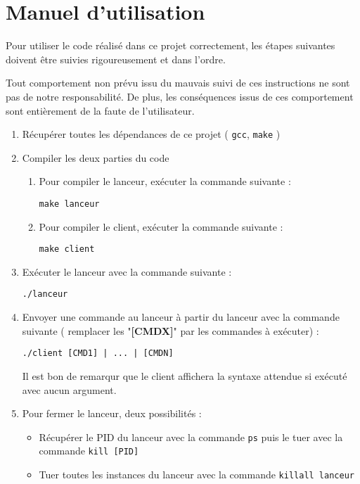 \documentclass[12pt]{article}
\begin{document}
    \section{Manuel d'utilisation}

    Pour utiliser le code réalisé dans ce projet correctement, les étapes suivantes doivent être suivies rigoureusement et dans l'ordre.

    Tout comportement non prévu issu du mauvais suivi de ces instructions ne sont pas de notre responsabilité. De plus, les conséquences issus de ces comportement sont entièrement de la faute de l'utilisateur.

    \begin{enumerate}
        \item Récupérer toutes les dépendances de ce projet ( \texttt{gcc}, \texttt{make} )
        \item Compiler les deux parties du code
        \begin{enumerate}
            \item Pour compiler le lanceur, exécuter la commande suivante : \begin{center}
                                                                                \texttt{make lanceur}
            \end{center}
            \item Pour compiler le client, exécuter la commande suivante : \begin{center}
                                                                               \texttt{make client}
            \end{center}
        \end{enumerate}
        \item Exécuter le lanceur avec la commande suivante : \begin{center}
                                                                  \texttt{./lanceur}
        \end{center}
        \item Envoyer une commande au lanceur à partir du lanceur avec la commande suivante ( remplacer les "\textbf{[CMDX]}" par les commandes à exécuter) : \begin{center}
                                                                                                                                                                  \texttt{./client [CMD1] | ... | [CMDN]}
        \end{center}
        Il est bon de remarqur que le client affichera la syntaxe attendue si exécuté avec aucun argument.
        \item Pour fermer le lanceur, deux possibilités :
        \begin{itemize}
            \item Récupérer le PID du lanceur avec la commande \texttt{ps} puis le tuer avec la commande \texttt{kill [PID]}
            \item Tuer toutes les instances du lanceur avec la commande \texttt{killall lanceur}
        \end{itemize}
    \end{enumerate}
\end{document}
